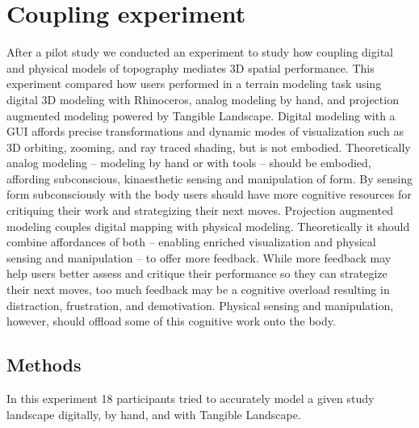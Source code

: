 \documentclass[prodmode,acmtochi]{acmsmall} %
\begin{document}
\section{Coupling experiment}
After a pilot study \cite{Harmon2016b}
we conducted an experiment to study how 
coupling digital and physical models of topography 
mediates 3D spatial performance. 
%
This experiment compared how users performed 
in a terrain modeling task using 
digital 3D modeling with Rhinoceros, 
analog modeling by hand, 
and projection augmented modeling powered by Tangible Landscape. 
Digital modeling with a GUI affords precise transformations and
dynamic modes of visualization such as 
3D orbiting, zooming, and ray traced shading,
but is not embodied.
Theoretically analog modeling -- modeling by hand or with tools -- 
should be embodied, 
affording subconscious, kinaesthetic sensing and manipulation of form. 
By sensing form subconsciously with the body
users should have more cognitive resources for critiquing their work 
and strategizing their next moves. 
% 
Projection augmented modeling 
couples digital mapping with physical modeling.
Theoretically it should combine affordances of both -- 
enabling enriched visualization and physical sensing and manipulation -- 
to offer more feedback.
While more feedback may help users 
better assess and critique their performance 
so they can strategize their next moves,
too much feedback may be a cognitive overload 
resulting in distraction, frustration, and demotivation. 
Physical sensing and manipulation, however, should offload 
some of this cognitive work onto the body.

\subsection{Methods}
In this experiment 
18 participants tried to accurately model a given study landscape 
digitally, by hand, and with Tangible Landscape. 

% 
% 

\end{document}
